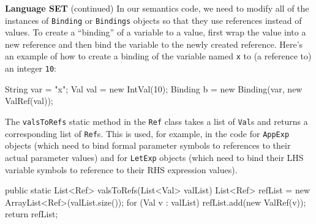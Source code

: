 \begin{minipage}[t]{\sw}
\slidenumber
\LARGE
{\bf Language SET} (continued)\exx
In our semantics code,
we need to modify all of the instances
of \verb'Binding' or \verb'Bindings' objects
so that they use references instead of values.
To create a ``binding'' of a variable to a value,
first wrap the value into a new reference
and then bind the variable to the newly created reference.
Here's an example of how to create a binding
of the variable named \verb'x'
to (a reference to) an integer \verb'10':
{\Large
\begin{qv}
String var = "x";
Val val = new IntVal(10);
Binding b = new Binding(var, new ValRef(val));
\end{qv}
}
The \verb'valsToRefs' static method
in the \verb'Ref' class takes a list of \verb'Val's
and returns a corresponding list of \verb'Ref's.
This is used, for example,
in the code for \verb'AppExp' objects
(which need to bind formal parameter symbols
to references to their actual parameter values)
and for \verb'LetExp' objects
(which need to bind their LHS variable symbols
to reference to their RHS expression values).
{\Large
\begin{qv}
public static List<Ref> valsToRefs(List<Val> valList) {
    List<Ref> refList = new ArrayList<Ref>(valList.size());
    for (Val v : valList)
        refList.add(new ValRef(v));
    return refList;
}
\end{qv}
}
\end{minipage}
\clearpage
